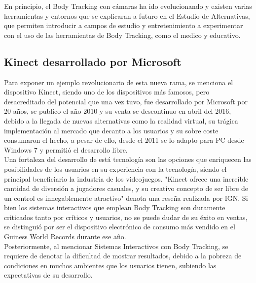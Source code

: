 En principio, el Body Tracking con cámaras ha ido evolucionando y existen varias herramientas y entornos que se explicaran a futuro en el Estudio de Alternativas, que permiten introducir a campos de estudio y entretenimiento a experimentar con el uso de las herramientas de Body Tracking, como el medico y educativo.\\

\subsection{Kinect desarrollado por Microsoft}

Para exponer un ejemplo revolucionario de esta nueva rama, se menciona el dispositivo Kinect, siendo uno de los dispositivos más famosos, pero desacreditado del potencial que una vez tuvo, fue desarrollado por Microsoft por 20 años, se publico el año 2010 y su venta se descontinuo en abril del 2016, debido a la llegada de nuevas alternativas como la realidad virtual, su trágica implementación al mercado que decanto a los usuarios y  su sobre coste consumaron el hecho, a pesar de ello, desde el 2011 se lo adapto para PC desde Windows 7 y permitió el desarrollo libre. \\

Una fortaleza del desarrollo de está tecnología son las opciones que enriquecen las posibilidades de los usuarios en su experiencia con la tecnología, siendo el principal beneficiario la industria de los videojuegos. 
"Kinect ofrece una increíble cantidad de diversión a jugadores casuales, y su creativo concepto de ser libre de un control es innegablemente atractivo" denota una reseña realizada por IGN. Si bien los sistemas interactivos que emplean Body Tracking son duramente criticados tanto por críticos y usuarios, no se puede dudar de su éxito en ventas, se distinguió por ser el dispositivo electrónico de consumo más vendido en el Guiness World Records durante ese año.\cite{7934445}\\
Posteriormente, al mencionar Sistemas Interactivos con Body Tracking, se requiere de denotar la dificultad de mostrar resultados, debido a la pobreza de condiciones en muchos ambientes que los usuarios tienen, subiendo las expectativas de su desarrollo. 

